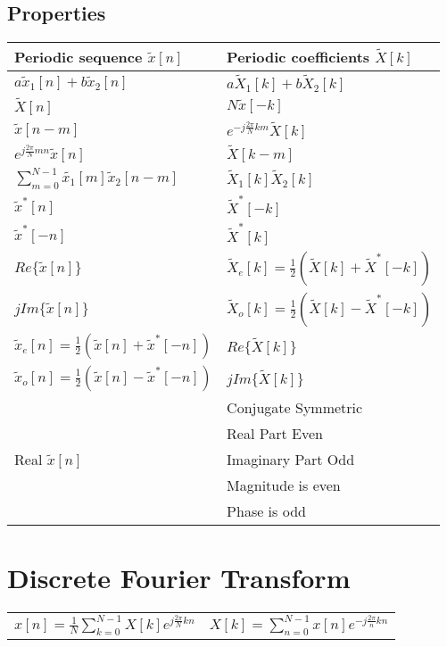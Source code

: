 \documentclass{article}
\begin{document}
\subsection*{Properties}
\begin{center}
    \begin{tabularx}{\textwidth}{XX}
        \hline
        Periodic sequence $\tilde{x}[n]$ & Periodic coefficients $\tilde{X}[k]$\\
        \hline
        $a\tilde{x}_1[n] + b\tilde{x}_2[n]$ & $a\tilde{X}_1[k]+b\tilde{X}_2[k]$\\
        $\tilde{X}[n]$ & $N\tilde{x}[-k]$\\
        $\tilde{x}[n-m]$ & $e^{-j\frac{2\pi}{N}km}\tilde{X}[k]$\\
        $e^{j\frac{2\pi}{N}mn}\tilde{x}[n]$ & $\tilde{X}[k-m]$\\
        $\sum_{m=0}^{N-1}{\tilde{x_1}[m]\tilde{x}_2[n-m]}$ & $\tilde{X}_1[k]\tilde{X}_2[k]$\\
        $\tilde{x}^*[n]$ & $\tilde{X}^*[-k]$\\
        $\tilde{x}^*[-n]$ & $\tilde{X}^*[k]$\\
        $Re\{\tilde{x}[n]\}$ & $\tilde{X}_e[k] = \frac{1}{2}\left(\tilde{X}[k]+\tilde{X}^*[-k]\right)$\\
        $jIm\{\tilde{x}[n]\}$ & $\tilde{X}_o[k] = \frac{1}{2}\left(\tilde{X}[k]-\tilde{X}^*[-k]\right)$\\
        $\tilde{x}_e[n] = \frac{1}{2}\left(\tilde{x}[n]+\tilde{x}^*[-n]\right)$ & $Re\{\tilde{X}[k]\}$\\
        $\tilde{x}_o[n] = \frac{1}{2}\left(\tilde{x}[n]-\tilde{x}^*[-n]\right)$ & $jIm\{\tilde{X}[k]\}$\\
        \hline
        & Conjugate Symmetric\\
        & Real Part Even\\
        Real $\tilde{x}[n]$ & Imaginary Part Odd\\
        & Magnitude is even\\
        & Phase is odd
    \end{tabularx}
\end{center}
\section*{Discrete Fourier Transform}
\begin{center}
    \begin{tabularx}{\textwidth - 1in}{XX}
        $x[n] = \frac{1}{N}\sum_{k=0}^{N-1} X[k]e^{j\frac{2\pi}{N}kn}$ & $X[k] = \sum_{n=0}^{N-1}{x[n]e^{-j\frac{2\pi}{n}kn}}$
    \end{tabularx}
\end{center}
\end{document}

